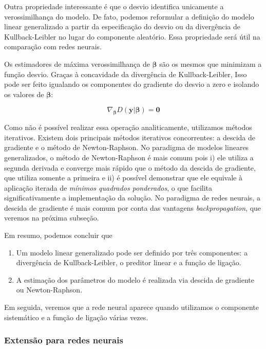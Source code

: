 \documentclass[12pt,]{report}
\providecommand{\tightlist}{%
  \setlength{\itemsep}{0pt}\setlength{\parskip}{0pt}}
\begin{document}
Outra propriedade interessante é que o desvio identifica unicamente a
verossimilhança do modelo. De fato, podemos reformular a definição do
modelo linear generalizado a partir da especificação do desvio ou da
divergência de Kullback-Leibler no lugar do componente aleatório. Essa
propriedade será útil na comparação com redes neurais.

Os estimadores de máxima verossimilhança de \(\boldsymbol \beta\) são os
mesmos que minimizam a função desvio. Graças à concavidade da
divergência de Kullback-Leibler, Isso pode ser feito igualando os
componentes do gradiente do desvio a zero e isolando os valores de
\(\boldsymbol \beta\):

\[
\nabla_{\boldsymbol \beta} D(\mathbf y|{ \boldsymbol \beta}) = \mathbf 0
\]

Como não é possível realizar essa operação analiticamente, utilizamos
métodos iterativos. Existem dois principais métodos iterativos
concorrentes: a descida de gradiente e o método de Newton-Raphson. No
paradigma de modelos lineares generalizados, o método de Newton-Raphson
é mais comum pois i) ele utiliza a segunda derivada e converge mais
rápido que o método da descida de gradiente, que utiliza somente a
primeira e ii) é possível demonstrar que ele equivale à aplicação
iterada de \emph{mínimos quadrados ponderados}, o que facilita
significativamente a implementação da solução. No paradigma de redes
neurais, a descida de gradiente é mais comum por conta das vantagens
\emph{backpropagation}, que veremos na próxima subseção.

Em resumo, podemos concluir que

\begin{enumerate}
\def\labelenumi{\arabic{enumi}.}
\tightlist
\item
  Um modelo linear generalizado pode ser definido por três componentes:
  a divergência de Kullback-Leibler, o preditor linear e a função de
  ligação.
\item
  A estimação dos parâmetros do modelo é realizada via descida de
  gradiente ou Newton-Raphson.
\end{enumerate}

Em seguida, veremos que a rede neural aparece quando utilizamos o
componente sistemático e a função de ligação várias vezes.

\subsubsection{Extensão para redes
neurais}\label{extensao-para-redes-neurais}
\end{document}
